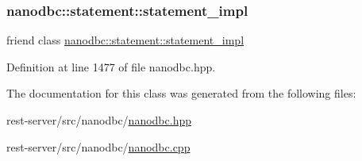 \subsubsection{\texorpdfstring{nanodbc::statement::statement\_impl}{nanodbc::statement::statement\_impl}}
{\footnotesize\ttfamily friend class \mbox{\hyperlink{classnanodbc_1_1statement_1_1statement__impl}{nanodbc\+::statement\+::statement\+\_\+impl}}\hspace{0.3cm}{\ttfamily [friend]}}



Definition at line 1477 of file nanodbc.\+hpp.



The documentation for this class was generated from the following files\+:\begin{DoxyCompactItemize}
\item 
rest-\/server/src/nanodbc/\mbox{\hyperlink{nanodbc_8hpp}{nanodbc.\+hpp}}\item 
rest-\/server/src/nanodbc/\mbox{\hyperlink{nanodbc_8cpp}{nanodbc.\+cpp}}\end{DoxyCompactItemize}
